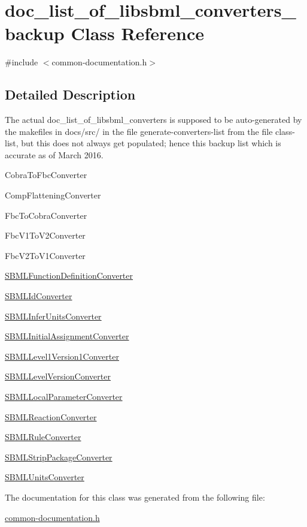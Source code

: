 \hypertarget{classdoc__list__of__libsbml__converters__backup}{}\section{doc\+\_\+list\+\_\+of\+\_\+libsbml\+\_\+converters\+\_\+backup Class Reference}
\label{classdoc__list__of__libsbml__converters__backup}


{\ttfamily \#include $<$common-\/documentation.\+h$>$}



\subsection{Detailed Description}
The actual doc\+\_\+list\+\_\+of\+\_\+libsbml\+\_\+converters is supposed to be auto-\/generated by the makefiles in docs/src/ in the file generate-\/converters-\/list from the file class-\/list, but this does not always get populated; hence this backup list which is accurate as of March 2016.

\begin{DoxyParagraph}{}

\begin{DoxyItemize}
\item Cobra\+To\+Fbc\+Converter 
\item Comp\+Flattening\+Converter 
\item Fbc\+To\+Cobra\+Converter 
\item Fbc\+V1\+To\+V2\+Converter 
\item Fbc\+V2\+To\+V1\+Converter 
\item \hyperlink{class_s_b_m_l_function_definition_converter}{S\+B\+M\+L\+Function\+Definition\+Converter} 
\item \hyperlink{class_s_b_m_l_id_converter}{S\+B\+M\+L\+Id\+Converter} 
\item \hyperlink{class_s_b_m_l_infer_units_converter}{S\+B\+M\+L\+Infer\+Units\+Converter} 
\item \hyperlink{class_s_b_m_l_initial_assignment_converter}{S\+B\+M\+L\+Initial\+Assignment\+Converter} 
\item \hyperlink{class_s_b_m_l_level1_version1_converter}{S\+B\+M\+L\+Level1\+Version1\+Converter} 
\item \hyperlink{class_s_b_m_l_level_version_converter}{S\+B\+M\+L\+Level\+Version\+Converter} 
\item \hyperlink{class_s_b_m_l_local_parameter_converter}{S\+B\+M\+L\+Local\+Parameter\+Converter} 
\item \hyperlink{class_s_b_m_l_reaction_converter}{S\+B\+M\+L\+Reaction\+Converter} 
\item \hyperlink{class_s_b_m_l_rule_converter}{S\+B\+M\+L\+Rule\+Converter} 
\item \hyperlink{class_s_b_m_l_strip_package_converter}{S\+B\+M\+L\+Strip\+Package\+Converter} 
\item \hyperlink{class_s_b_m_l_units_converter}{S\+B\+M\+L\+Units\+Converter} 
\end{DoxyItemize}
\end{DoxyParagraph}


The documentation for this class was generated from the following file\+:\begin{DoxyCompactItemize}
\item 
\hyperlink{common-documentation_8h}{common-\/documentation.\+h}\end{DoxyCompactItemize}
